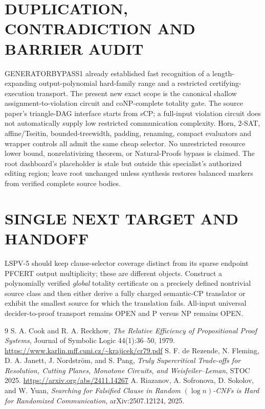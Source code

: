 \documentclass[11pt]{article}
\begin{document}
\section{DUPLICATION, CONTRADICTION AND BARRIER AUDIT}
GENERATORBYPASS1 already established fast recognition of a
length-expanding output-polynomial hard-family range and a
restricted certifying-execution transport. The present new exact
scope is the canonical shallow assignment-to-violation circuit
and coNP-complete totality gate. The source paper's triangle-DAG
interface starts from sCP; a full-input violation circuit does
not automatically supply low restricted communication complexity.
Horn, 2-SAT, affine/Tseitin, bounded-treewidth, padding, renaming,
compact evaluators and wrapper controls all admit the same cheap
selector. No unrestricted resource lower bound, nonrelativizing
theorem, or Natural-Proofs bypass is claimed. The root dashboard's
placeholder is stale but outside this specialist's authorized
editing region; leave root unchanged unless synthesis restores
balanced markers from verified complete source bodies.

\section{SINGLE NEXT TARGET AND HANDOFF}
LSPV-5 should keep clause-selector coverage distinct from its sparse
endpoint PFCERT output multiplicity; these are different objects.
Construct a polynomially verified \emph{global} totality certificate
on a precisely defined nontrivial source class and then either derive
a fully charged semantic-CP translator or exhibit the smallest
source for which the translation fails. All-input universal
decider-to-proof transport remains OPEN and P versus NP remains OPEN.

\begin{thebibliography}{9}\small
{} S. A. Cook and R. A. Reckhow,
\emph{The Relative Efficiency of Propositional Proof Systems},
Journal of Symbolic Logic 44(1):36--50, 1979.
\url{https://www.karlin.mff.cuni.cz/~krajicek/cr79.pdf}
 S. F. de Rezende, N. Fleming,
D. A. Janett, J. Nordstr\"om, and S. Pang,
\emph{Truly Supercritical Trade-offs for Resolution, Cutting Planes,
Monotone Circuits, and Weisfeiler--Leman}, STOC 2025.
\url{https://arxiv.org/abs/2411.14267}
 A. Riazanov, A. Sofronova, D. Sokolov,
and W. Yuan, \emph{Searching for Falsified Clause in Random
$(\log n)$-CNFs is Hard for Randomized Communication},
arXiv:2507.12124, 2025.
\end{thebibliography}
\end{document}
